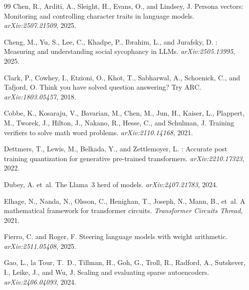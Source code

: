 \documentclass{article}
\begin{document}
\begin{thebibliography}{99}
Chen, R., Arditi, A., Sleight, H., Evans, O., and Lindsey, J.
\newblock Persona vectors: Monitoring and controlling character traits
 in language models.
\newblock \emph{arXiv:2507.21509}, 2025.

Cheng, M., Yu, S., Lee, C., Khadpe, P., Ibrahim, L., and Jurafsky, D.
: Measuring and understanding social sycophancy in
 {LLMs}.
\newblock \emph{arXiv:2505.13995}, 2025.

Clark, P., Cowhey, I., Etzioni, O., Khot, T., Sabharwal, A., Schoenick,
 C., and Tafjord, O.
\newblock Think you have solved question answering? {T}ry {ARC}.
\newblock \emph{arXiv:1803.05457}, 2018.

Cobbe, K., Kosaraju, V., Bavarian, M., Chen, M., Jun, H., Kaiser, L.,
 Plappert, M., Tworek, J., Hilton, J., Nakano, R., Hesse, C., and
 Schulman, J.
\newblock Training verifiers to solve math word problems.
\newblock \emph{arXiv:2110.14168}, 2021.

Dettmers, T., Lewis, M., Belkada, Y., and Zettlemoyer, L.
: Accurate post training quantization for generative
 pre-trained transformers.
\newblock \emph{arXiv:2210.17323}, 2022.

Dubey, A. et~al.
\newblock The {Llama~3} herd of models.
\newblock \emph{arXiv:2407.21783}, 2024.

Elhage, N., Nanda, N., Olsson, C., Henighan, T., Joseph, N., Mann, B.,
 et~al.
\newblock A mathematical framework for transformer circuits.
\newblock \emph{Transformer Circuits Thread}, 2021.

Fierro, C. and Roger, F.
\newblock Steering language models with weight arithmetic.
\newblock \emph{arXiv:2511.05408}, 2025.

Gao, L., la Tour, T.~D., Tillman, H., Goh, G., Troll, R.,
 Radford, A., Sutskever, I., Leike, J., and Wu, J.
\newblock Scaling and evaluating sparse autoencoders.
\newblock \emph{arXiv:2406.04093}, 2024.


\end{thebibliography}
\end{document}
